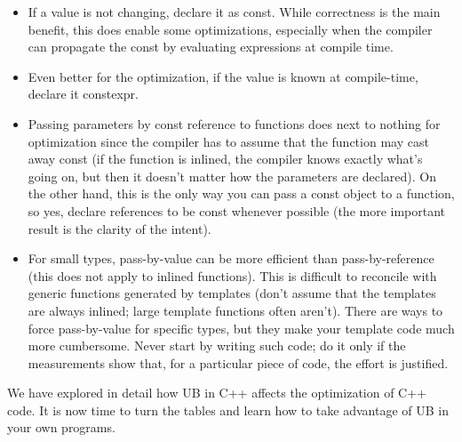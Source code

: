 \begin{itemize}
\item 
If a value is not changing, declare it as const. While correctness is the main benefit, this does enable some optimizations, especially when the compiler can propagate the const by evaluating expressions at compile time.

\item 
Even better for the optimization, if the value is known at compile-time, declare it constexpr.

\item 
Passing parameters by const reference to functions does next to nothing for optimization since the compiler has to assume that the function may cast away const (if the function is inlined, the compiler knows exactly what's going on, but then it doesn't matter how the parameters are declared). On the other hand, this is the only way you can pass a const object to a function, so yes, declare references to be const whenever possible (the more important result is the clarity of the intent).

\item 
For small types, pass-by-value can be more efficient than pass-by-reference (this does not apply to inlined functions). This is difficult to reconcile with generic functions generated by templates (don't assume that the templates are always inlined; large template functions often aren't). There are ways to force pass-by-value for specific types, but they make your template code much more cumbersome. Never start by writing such code; do it only if the measurements show that, for a particular piece of code, the effort is justified.

\end{itemize}

We have explored in detail how UB in C++ affects the optimization of C++ code. It is now time to turn the tables and learn how to take advantage of UB in your own programs.

























